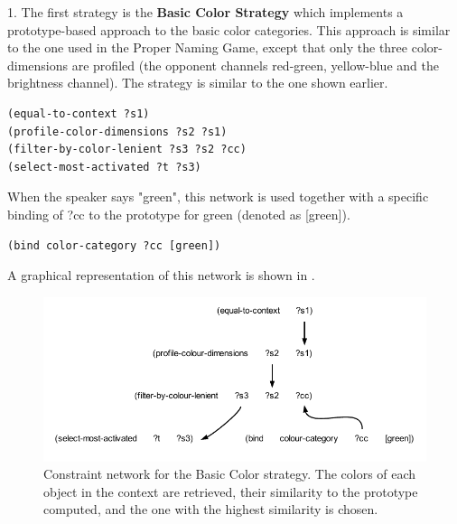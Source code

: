 1. The first strategy is the {\bf Basic Color Strategy} which implements a prototype-based approach to 
the basic color categories. This approach is similar to the one used in the Proper Naming Game, except that 
only the three color-dimensions are profiled (the opponent channels red-green, yellow-blue and the brightness channel). 
The strategy is similar to the one shown earlier. 
\begin{verbatim}
(equal-to-context ?s1) 
(profile-color-dimensions ?s2 ?s1)
(filter-by-color-lenient ?s3 ?s2 ?cc)
(select-most-activated ?t ?s3)
\end{verbatim}
When the speaker says "green", this network is used together with a specific binding of ?cc to the prototype for 
green (denoted as [green]). 
\begin{verbatim}
(bind color-category ?cc [green])
\end{verbatim}
A graphical representation of this network is shown in . 
\begin{figure}[htbp]
  \centerline{\includegraphics[width=1.0\textwidth]{chap11/figs/basic-strat}}
\caption{\footnotesize\label{fig:basic-strat} 
Constraint network for the Basic Color strategy. The colors of each object in the context are retrieved, their 
similarity to the prototype computed, and the one with the highest similarity is chosen.}
\end{figure}

